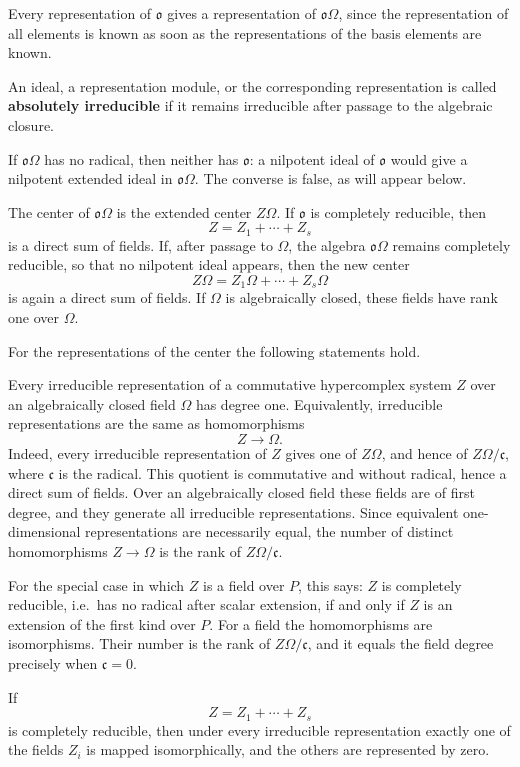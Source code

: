 \documentclass[
  11pt,
]{article}
\begin{document}
Every representation of \(\mathfrak{o}\) gives a representation of
\(\mathfrak{o}\Omega\), since the representation of all elements is
known as soon as the representations of the basis elements are known.

An ideal, a representation module, or the corresponding representation
is called \textbf{absolutely irreducible} if it remains irreducible
after passage to the algebraic closure.

If \(\mathfrak{o}\Omega\) has no radical, then neither has
\(\mathfrak{o}\): a nilpotent ideal of \(\mathfrak{o}\) would give a
nilpotent extended ideal in \(\mathfrak{o}\Omega\). The converse is
false, as will appear below.

The center of \(\mathfrak{o}\Omega\) is the extended center \(Z\Omega\).
If \(\mathfrak{o}\) is completely reducible, then \[
  Z=Z_1+\cdots+Z_s
\] is a direct sum of fields. If, after passage to \(\Omega\), the
algebra \(\mathfrak{o}\Omega\) remains completely reducible, so that no
nilpotent ideal appears, then the new center \[
  Z\Omega=Z_1\Omega+\cdots+Z_s\Omega
\] is again a direct sum of fields. If \(\Omega\) is algebraically
closed, these fields have rank one over \(\Omega\).

For the representations of the center the following statements hold.

Every irreducible representation of a commutative hypercomplex system
\(Z\) over an algebraically closed field \(\Omega\) has degree one.
Equivalently, irreducible representations are the same as homomorphisms
\[
  Z\to\Omega.
\] Indeed, every irreducible representation of \(Z\) gives one of
\(Z\Omega\), and hence of \(Z\Omega/\mathfrak c\), where \(\mathfrak c\)
is the radical. This quotient is commutative and without radical, hence
a direct sum of fields. Over an algebraically closed field these fields
are of first degree, and they generate all irreducible representations.
Since equivalent one-dimensional representations are necessarily equal,
the number of distinct homomorphisms \(Z\to\Omega\) is the rank of
\(Z\Omega/\mathfrak c\).

For the special case in which \(Z\) is a field over \(P\), this says:
\(Z\) is completely reducible, i.e.~has no radical after scalar
extension, if and only if \(Z\) is an extension of the first kind over
\(P\). For a field the homomorphisms are isomorphisms. Their number is
the rank of \(Z\Omega/\mathfrak c\), and it equals the field degree
precisely when \(\mathfrak c=0\).

If \[
  Z=Z_1+\cdots+Z_s
\] is completely reducible, then under every irreducible representation
exactly one of the fields \(Z_i\) is mapped isomorphically, and the
others are represented by zero.
\end{document}
